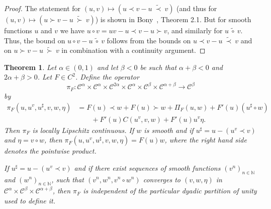 \documentclass[11pt,a4paper]{article}
\newtheorem{theorem}{Theorem}
\theoremstyle{remark}
\newcommand{\CC}{\ensuremath{\mathscr{C}}}
\begin{document}
\begin{proof}
   The statement for $(u,v) \mapsto (u \prec v - u \ \widetilde{\prec} \ v)$ (and thus for $(u,v) \mapsto (u \succ v - u \ \widetilde{\succ} \ v)$) is shown in Bony~\cite{Bony1981}, Theorem 2.1. But for smooth functions $u$ and $v$ we have $u \circ v = uv - u \prec v - u \succ v$, and similarly for $u \ \widetilde{\circ} \ v$. Thus, the bound on $u \circ v - u \ \widetilde{\circ} \ v$ follows from the bounds on $u \prec v - u \ \widetilde{\prec} \ v$ and on $u \succ v - u \ \widetilde{\succ} \ v$ in combination with a continuity argument.
\end{proof}

\begin{theorem}\label{theorem:product operator}
  Let $\alpha \in ( 0,1 )$ and let $\beta <0$ be such that $\alpha + \beta < 0$ and $2 \alpha + \beta >0$. Let $F \in C^{2}$. Define the operator
  \[
     \pi_{F} \colon \CC^\alpha \times \CC^{\alpha} \times \CC^{2 \alpha}  \times \CC^{\alpha} \times \CC^{\beta} \times \CC^{\alpha + \beta} \rightarrow \CC^{\beta}
  \]
  by
  \begin{align*}
     \pi_{F} ( u,u^{v} ,u^{\sharp} ,v,w, \eta ) &= F ( u ) \prec w+F ( u ) \succ w+ \Pi_{F} ( u,w ) +F' ( u ) ( u^{\sharp} \circ w ) \\
     &\qquad +F' ( u ) C ( u^{v} ,v,w ) +F' ( u ) u^{v} \eta.
  \end{align*}
  Then $\pi_{F}$ is locally Lipschitz continuous. If $w$ is smooth and if $u^{\sharp} =u- ( u^{v} \prec v )$ and $\eta =v \circ w$, then $\pi_{F} ( u,u^{v} ,u^{\sharp} ,v,w, \eta ) =F ( u ) w$, where the right hand side denotes the pointwise product.
  
  If $u^{\sharp} =u- ( u^{v} \prec v)$ and if there exist sequences of smooth functions $( v^{n} )_{n \in \mathbb{N}}$ and $( w^{n} )_{n \in \mathbb{N}}$, such that $( v^{n} ,w^{n},v^{n} \circ w^{n} )$ converges to $( v,w, \eta )$ in $\CC^{\alpha}\times \CC^{\beta} \times \CC^{\alpha + \beta}$, then $\pi_{F}$ is independent of the particular dyadic partition of unity used to define it.
\end{theorem}
\end{document}
